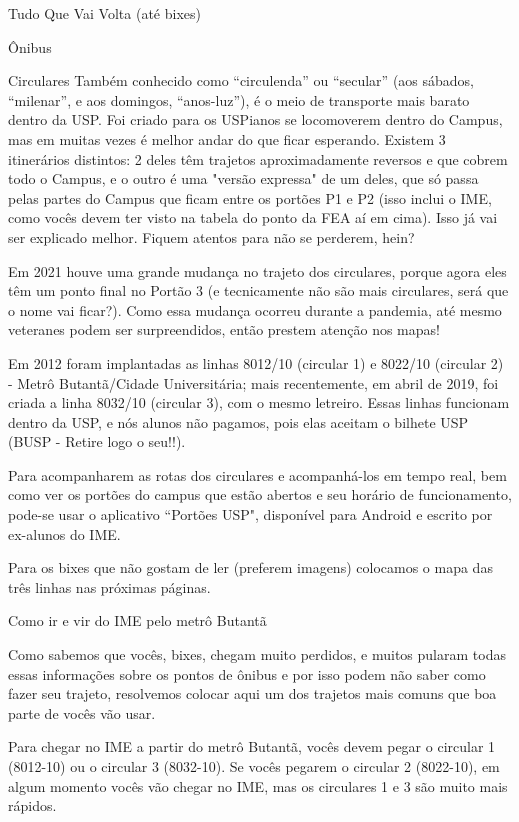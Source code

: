 \begin{secao}{Tudo Que Vai Volta (até bixes)}
\begin{subsecao}{Ônibus}
\begin{subsubsecao}{Circulares}
Também conhecido como ``circulenda'' ou ``secular'' (aos sábados, ``milenar'',
e aos domingos, ``anos-luz''), é o meio de transporte mais barato dentro da USP.
Foi criado para os USPianos se locomoverem dentro do Campus, mas em muitas vezes
é melhor andar do que ficar esperando. Existem 3 itinerários distintos: 2 deles têm
trajetos aproximadamente reversos e que cobrem todo o Campus, e o outro é uma "versão
expressa" de um deles, que só passa pelas partes do Campus que ficam entre os portões
P1 e P2 (isso inclui o IME, como vocês devem ter visto na tabela do ponto da FEA aí
em cima). Isso já vai ser explicado melhor. Fiquem atentos para não se perderem, hein?

Em 2021 houve uma grande mudança no trajeto dos circulares, porque agora eles têm um
ponto final no Portão 3 (e tecnicamente não são mais circulares, será que o nome vai ficar?).
Como essa mudança ocorreu durante a pandemia, até mesmo veteranes podem ser surpreendidos,
então prestem atenção nos mapas!

Em 2012 foram implantadas as linhas 8012/10 (circular 1) e 8022/10 (circular 2)
- Metrô Butantã/Cidade Universitária; mais recentemente, em abril de 2019, foi
criada a linha 8032/10 (circular 3), com o mesmo letreiro. Essas linhas funcionam
dentro da USP, e nós alunos não pagamos, pois elas aceitam o bilhete USP
(BUSP - Retire logo o seu!!).

Para acompanharem as rotas dos circulares e acompanhá-los em tempo real, bem como
ver os portões do campus que estão abertos e seu horário de funcionamento, pode-se
usar o aplicativo “Portões USP", disponível para Android e escrito por ex-alunos
do IME.

Para os bixes que não gostam de ler (preferem imagens) colocamos o
mapa das três linhas nas próximas páginas.


\end{subsubsecao}

\begin{subsubsecao}{Como ir e vir do IME pelo metrô Butantã}

Como sabemos que vocês, bixes, chegam muito perdidos, e muitos pularam todas essas informações
sobre os pontos de ônibus e por isso podem não saber como fazer seu trajeto, resolvemos colocar
aqui um dos trajetos mais comuns que boa parte de vocês vão usar.

Para chegar no IME a partir do metrô Butantã, vocês devem pegar o circular 1 (8012-10) ou o
circular 3 (8032-10). Se vocês pegarem o circular 2 (8022-10), em algum momento vocês vão
chegar no IME, mas os circulares 1 e 3 são muito mais rápidos.


\end{subsubsecao}
\end{subsecao}
\end{secao}
